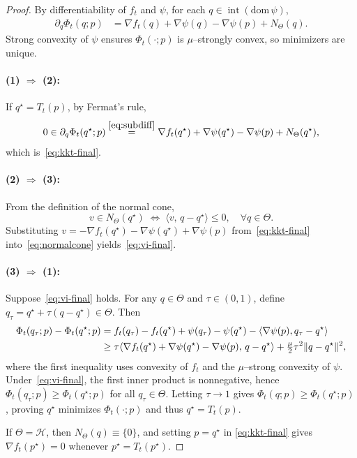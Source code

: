 \documentclass[11pt]{article}
\theoremstyle{plain}
\theoremstyle{definition}
\theoremstyle{remark}
\begin{document}
\begin{proof}
By differentiability of $f_t$ and $\psi$, for each $q\in\operatorname{int}(\mathrm{dom}\,\psi)$,
\begin{align}
\partial_q\Phi_t(q;p)
&=\nabla f_t(q)+\nabla\psi(q)-\nabla\psi(p)+N_\Theta(q).
\label{eq:subdiff}
\end{align}
Strong convexity of $\psi$ ensures $\Phi_t(\cdot;p)$ is $\mu$–strongly convex,
so minimizers are unique.

\paragraph{(1) $\Longrightarrow$ (2):}
If $q^\star=T_t(p)$, by Fermat’s rule,
\begin{equation}
0\in \partial_q\Phi_t(q^\star;p)
\stackrel{\eqref{eq:subdiff}}{=}
\nabla f_t(q^\star)+\nabla\psi(q^\star)-\nabla\psi(p)+N_\Theta(q^\star),
\end{equation}
which is~\eqref{eq:kkt-final}.

\paragraph{(2) $\Longrightarrow$ (3):}
From the definition of the normal cone,
\begin{equation}
v\in N_\Theta(q^\star)
\;\Longleftrightarrow\;
\langle v,\,q-q^\star\rangle\le0,\quad\forall q\in\Theta.
\label{eq:normalcone}
\end{equation}
Substituting $v=-\nabla f_t(q^\star)-\nabla\psi(q^\star)+\nabla\psi(p)$ from~\eqref{eq:kkt-final}
into~\eqref{eq:normalcone} yields~\eqref{eq:vi-final}.

\paragraph{(3) $\Longrightarrow$ (1):}
Suppose~\eqref{eq:vi-final} holds.  
For any $q\in\Theta$ and $\tau\in(0,1)$, define $q_\tau=q^\star+\tau(q-q^\star)\in\Theta$.
Then
\begin{align}
\Phi_t(q_\tau;p)-\Phi_t(q^\star;p)
&=f_t(q_\tau)-f_t(q^\star)
   +\psi(q_\tau)-\psi(q^\star)
   -\langle\nabla\psi(p),q_\tau-q^\star\rangle \notag\\
&\ge \tau\langle\nabla f_t(q^\star)+\nabla\psi(q^\star)-\nabla\psi(p),\,q-q^\star\rangle
   +\tfrac{\mu}{2}\tau^2\|q-q^\star\|^2,
\label{eq:strongcvx}
\end{align}
where the first inequality uses convexity of $f_t$ and the $\mu$–strong convexity of $\psi$.
Under~\eqref{eq:vi-final}, the first inner product is nonnegative, hence
$\Phi_t(q_\tau;p)\ge\Phi_t(q^\star;p)$ for all $q_\tau\in\Theta$.
Letting $\tau\to1$ gives $\Phi_t(q;p)\ge\Phi_t(q^\star;p)$, proving
$q^\star$ minimizes $\Phi_t(\cdot;p)$ and thus $q^\star=T_t(p)$.

If $\Theta=\mathcal H$, then $N_\Theta(q)\equiv\{0\}$, and setting $p=q^\star$ in
\eqref{eq:kkt-final} gives $\nabla f_t(p^\star)=0$ whenever $p^\star=T_t(p^\star)$.
\end{proof}
\end{document}
